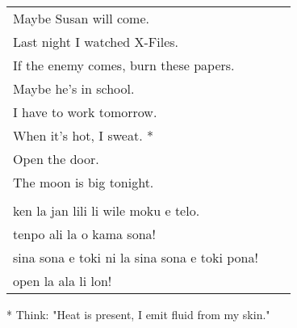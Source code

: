\begin{supertabular}{p{5,5cm}|ll}
Maybe Susan will come.  && \\ %
Last night I watched X-Files.  &&   \\ %
If the enemy comes, burn these papers.  &&   \\ %
Maybe he's in school.  &&   \\ %
I have to work tomorrow.  &&   \\ %
When it's hot, I sweat. *  &&  \\ %
Open the door.   &&  \\ %
The moon is big tonight.   &&  \\ %
 && \\ %
ken la jan lili li wile moku e telo.  &&   \\ %
tenpo ali la o kama sona!   &&  \\ %
sina sona e toki ni la sina sona e toki pona!   &&  \\ %
open la ala li lon! &&  \\  %
\end{supertabular}

* Think: "Heat is present, I emit fluid from my skin."
